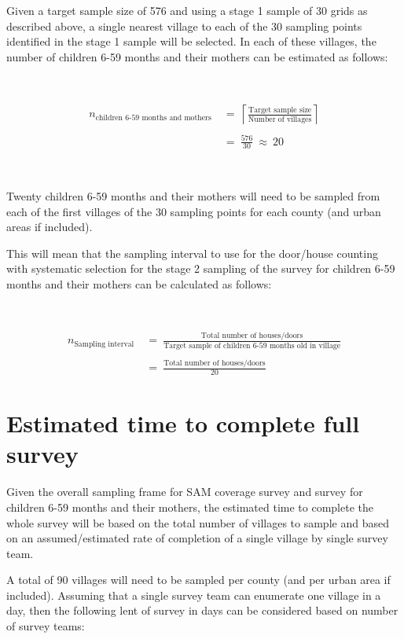 \documentclass[12pt,a4paper]{book}
\theoremstyle{definition}
\theoremstyle{definition}
\theoremstyle{definition}
\theoremstyle{remark}
\begin{document}
Given a target sample size of 576 and using a stage 1 sample of 30 grids
as described above, a single nearest village to each of the 30 sampling
points identified in the stage 1 sample will be selected. In each of
these villages, the number of children 6-59 months and their mothers can
be estimated as follows:

~

\[\begin{aligned} 
n_{\text{children 6-59 months and mothers}} & ~ = ~ \left \lceil \frac{\text{Target sample size}}{\text{Number of villages}} \right \rceil \\
\\
& ~ = ~ \frac{576}{30} ~ \approx ~ 20
\end{aligned}\]

~

Twenty children 6-59 months and their mothers will need to be sampled
from each of the first villages of the 30 sampling points for each
county (and urban areas if included).

This will mean that the sampling interval to use for the door/house
counting with systematic selection for the stage 2 sampling of the
survey for children 6-59 months and their mothers can be calculated as
follows:

~

\[\begin{aligned}
n_{\text{Sampling interval}} & ~ = ~ \frac{\text{Total number of houses/doors}}{\text{Target sample of children 6-59 months old in village}} \\
\\
& ~ = ~ \frac{\text{Total number of houses/doors}}{\text{20}}
\end{aligned}\]

\newpage

\hypertarget{estimated-time-to-complete-full-survey}{%
\section{Estimated time to complete full
survey}\label{estimated-time-to-complete-full-survey}}

Given the overall sampling frame for SAM coverage survey and survey for
children 6-59 months and their mothers, the estimated time to complete
the whole survey will be based on the total number of villages to sample
and based on an assumed/estimated rate of completion of a single village
by single survey team.

A total of 90 villages will need to be sampled per county (and per urban
area if included). Assuming that a single survey team can enumerate one
village in a day, then the following lent of survey in days can be
considered based on number of survey teams:
\end{document}
